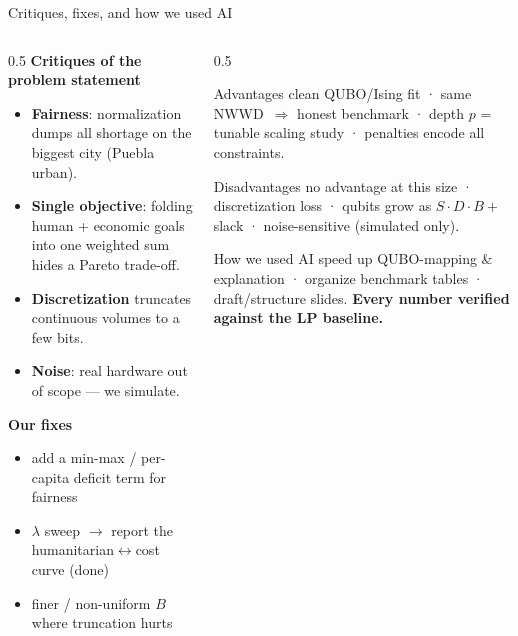 \documentclass[aspectratio=169,10pt]{beamer}
\newcommand{\NWWD}{\ensuremath{\mathrm{NWWD}}}
\newcommand{\hlt}[1]{{\color{cyan}\bfseries #1}}
\newcommand{\keyword}[1]{{\color{amber}\bfseries #1}}
\begin{document}
\begin{frame}{Critiques, fixes, and how we used AI}
\begin{columns}[T]
\begin{column}{0.5\textwidth}
\textbf{Critiques of the problem statement}
{\footnotesize
\begin{itemize}\setlength\itemsep{2pt}
\item \keyword{Fairness}: normalization dumps all shortage on the biggest city (Puebla urban).
\item \keyword{Single objective}: folding human + economic goals into one weighted sum hides a Pareto trade-off.
\item \keyword{Discretization} truncates continuous volumes to a few bits.
\item \keyword{Noise}: real hardware out of scope — we simulate.
\end{itemize}}
\vspace{2pt}
\textbf{Our fixes}
{\footnotesize
\begin{itemize}\setlength\itemsep{1pt}
\item add a min-max / per-capita deficit term for fairness
\item $\lambda$ sweep $\to$ report the humanitarian$\leftrightarrow$cost curve (done)
\item finer / non-uniform $B$ where truncation hurts
\end{itemize}}
\end{column}

\begin{column}{0.5\textwidth}
\begin{block}{Advantages}
{\footnotesize clean QUBO/Ising fit · same \NWWD\ $\Rightarrow$ honest benchmark · depth $p$ = tunable scaling study · penalties encode all constraints.}
\end{block}
\begin{block}{Disadvantages}
{\footnotesize no advantage at this size · discretization loss · qubits grow as $S\!\cdot\!D\!\cdot\!B+$slack · noise-sensitive (simulated only).}
\end{block}
\begin{block}{How we used AI}
{\footnotesize speed up QUBO-mapping \& explanation · organize benchmark tables · draft/structure slides. \hlt{Every number verified against the LP baseline.}}
\end{block}
\end{column}
\end{columns}
\end{frame}
\end{document}
